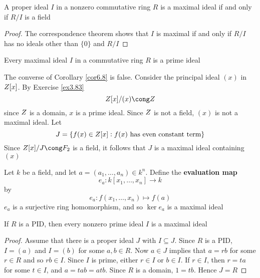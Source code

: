 \documentclass[11pt]{article}
\begin{document}
\begin{proposition}[]
A proper ideal \(I\) in a nonzero commutative ring \(R\) is a maximal ideal if
and only if \(R/I\) is a field
\end{proposition}

\begin{proof}
The correspondence theorem shows that \(I\) is maximal if and only if \(R/I\)
has no ideals other than \(\{0\}\) and \(R/I\)
\end{proof}

\begin{corollary}[]
\label{cor6.8}
Every maximal ideal \(I\) in a commutative ring \(R\) is a prime ideal
\end{corollary}

\begin{examplle}[]
The converse of Corollary \ref{cor6.8} is false. Consider the principal ideal
\((x)\) in \(\relax{Z}[x]\). By Exercise \ref{ex3.83}
\begin{equation*}
\Z[x]/(x)\cong\Z
\end{equation*}
since \(\relax{Z}\) is a domain, \(x\) is a prime ideal. Since \(\relax{Z}\) is not a field,
\((x)\) is not a maximal ideal. Let 
\begin{equation*}
J=\{f(x)\in\relax{Z}[x]:f(x)\text{ has even constant term}\}
\end{equation*}
Since \(\Z[x]/J\cong\F_2\) is a field, it follows that \(J\) is a maximal ideal
containing \((x)\)
\end{examplle}

\begin{examplle}[]
Let \(k\) be a field, and let \(a=(a_1,\dots,a_n)\in k^n\). Define the
\textbf{evaluation map}
\begin{equation*}
e_a:k[x_1,\dots,x_n]\to k
\end{equation*}
by
\begin{equation*}
e_a:f(x_1,\dots,x_n)\mapsto f(a)
\end{equation*}
\(e_a\) is a surjective ring homomorphism, and so \(\ker e_a\) is a maximal
ideal
\end{examplle}

\begin{theorem}[]
If \(R\) is a PID, then every nonzero prime ideal \(I\) is a maximal ideal
\end{theorem}

\begin{proof}
Assume that there is a proper ideal \(J\) with \(I\subseteq J\). Since \(R\) is a
PID, \(I=(a)\) and \(I=(b)\) for some \(a,b\in R\). Now \(a\in J\) implies
that \(a=rb\) for some \(r\in R\) and so \(rb\in I\). Since \(I\) is prime,
either \(r\in I\) or \(b\in I\). If \(r\in I\), then \(r=ta\) for some 
\(t\in I\), and \(a=tab=atb\). Since \(R\) is a domain, \(1=tb\). Hence \(J=R\)
\end{proof}
\end{document}
